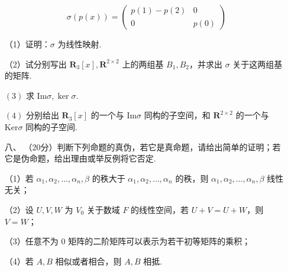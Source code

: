 \begin{enumerate}
	\[\sigma(p(x))=\begin{pmatrix}
	    p(1)-p(2)&0\\
	    0 & p(0)\end{pmatrix}\]

	（1）证明：$\sigma$ 为线性映射.

	（2）试分别写出 $\mathbf R_3[x],\mathbf R^{2\times 2}$ 上的两组基 $B_1,B_2$，并求出 $\sigma$ 关于这两组基的矩阵.

	$(3)$ 求 $\text{Im}\sigma,\ker\sigma$.

	$(4)$ 分别给出 $\mathbf R_3[x]$ 的一个与 $\text{Im}\sigma$ 同构的子空间，和 $\mathbf R^{2\times 2}$ 的一个与 $\text{Ker}\sigma$ 同构的子空间.
	\item[八、]（20分）判断下列命题的真伪，若它是真命题，请给出简单的证明；若它是伪命题，给出理由或举反例将它否定.

	（1）若 $\alpha_1,\alpha_2,\dots,\alpha_n,\beta$ 的秩大于 $\alpha_1,\alpha_2,\dots,\alpha_n$ 的秩，则 $\alpha_1,\alpha_2,\dots,\alpha_n,\beta$ 线性无关；

	（2）设 $U,V,W$ 为 $V_0$ 关于数域 $F$ 的线性空间，若 $U+V=U+W$，则 $V=W$；

	（3）任意不为 $0$ 矩阵的二阶矩阵可以表示为若干初等矩阵的乘积；

	（4）若 $A,B$ 相似或者相合，则 $A,B$ 相抵.
\end{enumerate}

\clearpage
